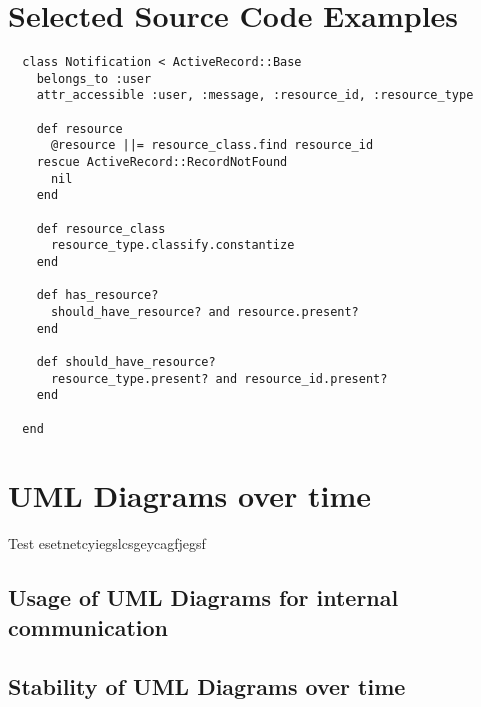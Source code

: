 \chapter{Selected Source Code Examples}
\label{chapter:CodeExamples}

\begin{lstlisting}
  class Notification < ActiveRecord::Base
    belongs_to :user
    attr_accessible :user, :message, :resource_id, :resource_type

    def resource
      @resource ||= resource_class.find resource_id
    rescue ActiveRecord::RecordNotFound
      nil
    end
  
    def resource_class
      resource_type.classify.constantize
    end
  
    def has_resource?
      should_have_resource? and resource.present?
    end
  
    def should_have_resource?
      resource_type.present? and resource_id.present?
    end
   
  end

\end{lstlisting}

\chapter{UML Diagrams over time}
\label{chapter:UMLDiagrams}

Test esetnetcyiegslcsgeycagfjegsf

\section{Usage of UML Diagrams for internal communication}

\lipsum[2]

\section{Stability of UML Diagrams over time}

\lipsum[3]

\pagebreak



